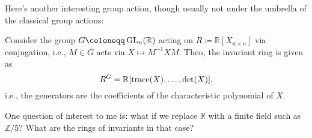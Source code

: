 \documentclass[12pt]{article}
\begin{document}
	Here's another interesting group action, though usually not under the umbrella of the classical group actions:
	\begin{thm}
		Consider the group $G \coloneqq \GL_{n}(\mathbb{R})$ acting on $R \coloneqq \mathbb{R}[X_{n \times n}]$ via conjugation, i.e., 
		$M \in G$ acts via $X \mapsto M^{-1} X M$. 
		Then, the invariant ring is given as
		\begin{equation*} 
			R^{G} = \mathbb{R}[\operatorname{trace}(X), \ldots, \det(X)],
		\end{equation*}
		i.e., the generators are the coefficients of the characteristic polynomial of $X$. 
	\end{thm}

	One question of interest to me is: what if we replace $\mathbb{R}$ with a finite field such as $\mathbb{Z}/5$? What are the rings of invariants in that case? 

\end{document}

